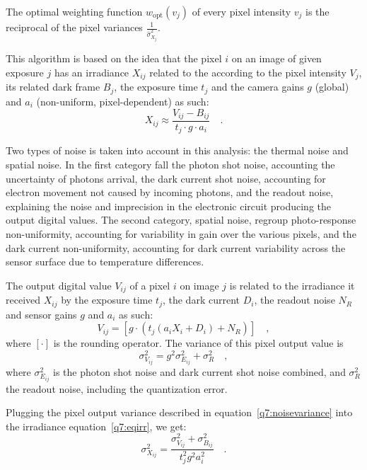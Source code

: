\documentclass{report}
\begin{document}
The optimal weighting function $w_{\mathrm{opt}}\left(v_j\right)$ of every pixel intensity $v_j$ is the reciprocal of the pixel variances $\frac{1}{\hat{\sigma}_{X_j}^2}$.

This algorithm is based on the idea that the pixel $i$ on an image of given exposure $j$ has an irradiance $X_{ij}$ related to the according to the pixel intensity $V_j$, its related dark frame $B_j$, the exposure time $t_j$ and the camera gains $g$ (global) and $a_i$ (non-uniform, pixel-dependent) as such:
\begin{equation}
\label{q7:eqirr}
X_{ij} \approx \frac{V_{ij} - B_{ij}}{t_j \cdot g \cdot a_i}
\quad.
\end{equation}

Two types of noise is taken into account in this analysis: the thermal noise and spatial noise. In the first category fall the photon shot noise, accounting the uncertainty of photons arrival, the dark current shot noise, accounting for electron movement not caused by incoming photons, and the readout noise, explaining the noise and imprecision in the electronic circuit producing the output digital values. The second category, spatial noise, regroup photo-response non-uniformity, accounting for variability in gain over the various pixels, and the dark current non-uniformity, accounting for dark current variability across the sensor surface due to temperature differences.

The output digital value $V_{ij}$ of a pixel $i$ on image $j$ is related to the irradiance it received $X_{ij}$ by the exposure time $t_j$, the dark current $D_i$, the readout noise $N_R$ and sensor gains $g$ and $a_i$ as such:
\begin{equation}
V_{ij} = \left[ g \cdot \left( t_j \left( a_i X_i + D_i \right ) + N_R\right) \right] \quad,
\end{equation}
where $\left[ \cdot \right]$ is the rounding operator. The variance of this pixel output value is
\begin{equation}
\label{q7:noisevariance}
\sigma_{V_{ij}}^2 = g^2 \sigma_{E_{ij}}^2 + \sigma_R^2
\quad,
\end{equation}
where $\sigma_{E_{ij}}^2$ is the photon shot noise and dark current shot noise combined, and $\sigma_R^2$ the readout noise, including the quantization error.

Plugging the pixel output variance described in equation~\eqref{q7:noisevariance} into the irradiance equation~\eqref{q7:eqirr}, we get:
\begin{equation}
\sigma_{X_{ij}}^2 = \frac{\sigma_{V_{ij}}^2 + \sigma_{B_{ij}}^2}{t_j^2 g^2 a_i^2} \quad.
\end{equation}
\end{document}
